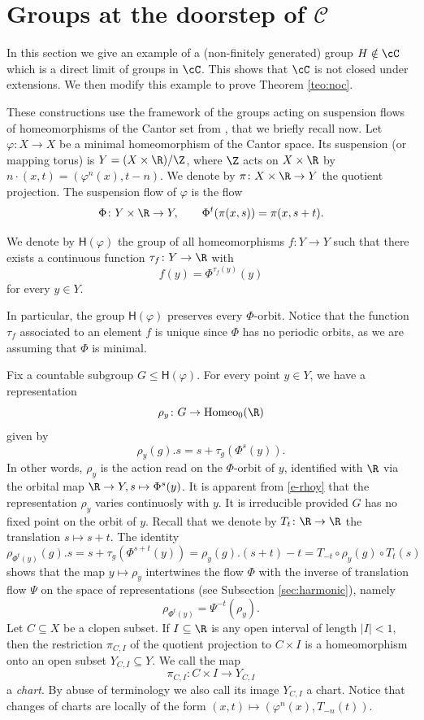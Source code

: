 \documentclass[reqno]{amsart}
\newcommand{\Hphi}{\mathsf{H}(\varphi)}
\begin{document}
\section{Groups at the doorstep of $\mathcal{C}$} \label{section:noC}
In this section we give an example of a (non-finitely generated) group $H\notin\cC$ which is a direct limit of groups in $\cC$. This shows that $\cC$ is not closed under extensions. We then modify this example to prove Theorem \ref{teo:noc}.


These constructions use the framework of the groups acting on  suspension flows of homeomorphisms of the Cantor set from \cite{MatteBonTriestino2020}, that we briefly recall now.  Let $\varphi\colon X\to X$ be a minimal homeomorphism of the Cantor space. 
Its suspension (or mapping torus) is $Y=(X\times \R)/\Z$, where $\Z$ acts on $X\times \R$ by $n\cdot (x, t)=(\varphi^n(x), t-n)$. We denote by $\pi\colon X\times \R\to Y$ the quotient projection. The suspension flow of $\varphi$ is the flow
\[\Phi\colon Y\times \R\to Y, \quad \quad \Phi^t(\pi(x, s))=\pi(x, s+t).\]


\begin{defn}
We denote by $\Hphi$ the group of all homeomorphisms $f\colon Y\to Y$ such that there exists a continuous function $\tau_f\colon Y\to \R$ with 
\[f(y)=\Phi^{\tau_f(y)}(y)\]
for every $y\in Y$.
\end{defn}
In particular, the group $\Hphi$ preserves every $\Phi$-orbit. Notice that the function $\tau_f$ associated to an element $f$ is unique since $\Phi$ has no periodic orbits, as we are assuming that $\Phi$ is minimal. 

Fix a countable subgroup $G\le \Hphi$. For every point $y\in Y$, we have a representation 
\[\rho_y\colon G\to \mathrm{Homeo}_0(\R)\]
given by 
\begin{equation} \rho_y(g).s=s+\tau_g(\Phi^s(y)). \label{e-rhoy} \end{equation}
In other words, $\rho_y$ is the action read on the $\Phi$-orbit of $y$, identified with $\R$ via the orbital map $\R\to Y, s\mapsto \Phi^s(y)$. It is apparent from \eqref{e-rhoy} that the  representation $\rho_y$ varies continuosly with $y$. It is irreducible provided  $G$ has no fixed point on the orbit of $y$. Recall that we denote by $T_t\colon \R\to \R$ the translation  $s\mapsto s+t$. The identity
\[\rho_{\Phi^t(y)}(g).s= s+\tau_g(\Phi^{s+t}(y))=\rho_y(g).(s+t)-t=T_{-t} \circ \rho_y(g) \circ T_t(s)\]
shows that the map $y\mapsto \rho_y$ intertwines the flow $\Phi$ with the inverse of translation flow $\Psi$  on the space of representations  (see Subsection \ref{sec:harmonic}), namely
\[\rho_{\Phi^t(y)}=\Psi^{-t}(\rho_y).\]
Let $C\subseteq X$ be a clopen subset. If $I\subseteq \R$ is any open interval of length $|I|<1$, then the restriction $\pi_{C, I}$ of the quotient projection to $C\times I$ is a homeomorphism onto an open subset $Y_{C, I}\subseteq Y$. 
We call the map \[\pi_{C, I}\colon C\times I\to Y_{C, I}\]
a \emph{chart}. By abuse of terminology we also call its image $Y_{C, I}$ a chart. Notice that changes of charts are locally of the form $(x, t)\mapsto (\varphi^n(x), T_{-n}(t))$. 
\end{document}
